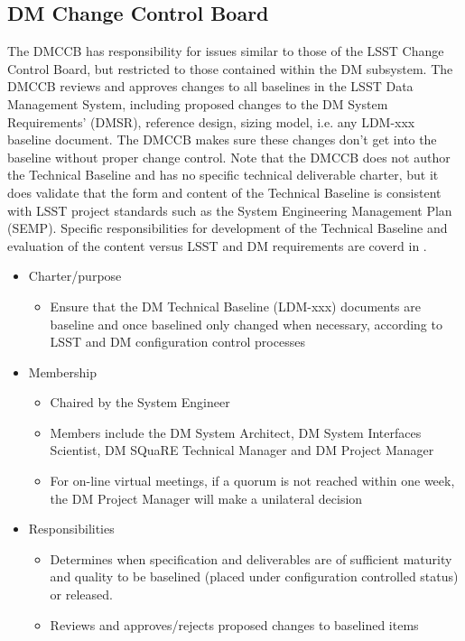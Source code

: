\subsection{DM Change Control Board \label{sect:tct}}
The DMCCB has responsibility for issues similar to those of the LSST Change Control Board, but restricted to those contained within the DM subsystem. 
The DMCCB reviews and approves changes to all baselines in the LSST Data Management System, including proposed changes to the DM System Requirements' (DMSR), reference design, sizing model, i.e. any LDM-xxx baseline document.
The DMCCB makes sure these changes don't get into the baseline without proper change control. 
Note that the DMCCB does not author the Technical Baseline and has no specific technical deliverable charter, but it does validate that the form and content of the Technical Baseline is consistent with LSST project standards such as the System Engineering Management Plan (SEMP).  
Specific responsibilities for development of the Technical Baseline and evaluation of the content versus LSST and DM requirements are coverd in .
\begin{itemize}
\item Charter/purpose
	\begin{itemize}
	\item Ensure that the DM Technical Baseline (LDM-xxx) documents are baseline and once baselined only changed when necessary, according to LSST and DM configuration control processes
	\end{itemize}
\item Membership
	\begin{itemize}
	\item Chaired by the System Engineer
	\item Members include the DM System Architect, DM System Interfaces Scientist, DM SQuaRE Technical Manager and DM Project Manager
	\item For on-line virtual meetings, if a quorum is not reached within one week, the DM Project Manager will make a unilateral decision
	\end{itemize}
\item Responsibilities
	\begin{itemize}
	\item Determines when specification and deliverables are of sufficient maturity and quality to be baselined (placed under configuration controlled status) or released. 
	\item Reviews and approves/rejects proposed changes to baselined items
	\end{itemize}
\end{itemize}

